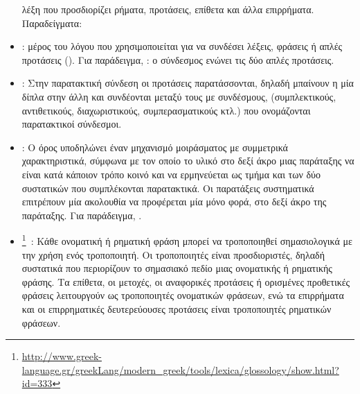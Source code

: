 \begin{itemize}
          λέξη που προσδιορίζει ρήματα, προτάσεις, επίθετα και άλλα επιρρήματα.
          Παραδείγματα:
    \item {}:
          μέρος του λόγου που χρησιμοποιείται για να συνδέσει λέξεις, φράσεις ή απλές προτάσεις ().
          Για παράδειγμα, : ο σύνδεσμος  ενώνει τις δύο απλές προτάσεις.
    \item {}:
          Στην παρατακτική σύνδεση οι προτάσεις παρατάσσονται, δηλαδή μπαίνουν η μία δίπλα στην άλλη και συνδέονται μεταξύ τους με συνδέσμους,
          (συμπλεκτικούς, αντιθετικούς, διαχωριστικούς, συμπερασματικούς κτλ.) που ονομάζονται παρατακτικοί σύνδεσμοι.
    \item {}:
          Ο όρος υποδηλώνει έναν μηχανισμό μοιράσματος με συμμετρικά χαρακτηριστικά,
          σύμφωνα με τον οποίο το υλικό στο δεξί άκρο μιας παράταξης να είναι κατά κάποιον τρόπο κοινό και να ερμηνεύεται ως τμήμα και των δύο συστατικών που συμπλέκονται παρατακτικά.
          Οι παρατάξεις συστηματικά επιτρέπουν μία ακολουθία να προφέρεται μία μόνο φορά, στο δεξί άκρο της παράταξης.
          Για παράδειγμα, .
    \item {}\footnote{\url{http://www.greek-language.gr/greekLang/modern_greek/tools/lexica/glossology/show.html?id=333}}~\cite{komvos}:
          Κάθε ονοματική ή ρηματική φράση μπορεί να τροποποιηθεί σημασιολογικά με την χρήση ενός τροποποιητή.
          Οι τροποποιητές είναι προσδιοριστές, δηλαδή συστατικά που περιορίζουν το σημασιακό πεδίο μιας ονοματικής ή ρηματικής φράσης.
          Τα επίθετα, οι μετοχές, οι αναφορικές προτάσεις ή ορισμένες προθετικές φράσεις λειτουργούν ως τροποποιητές ονοματικών φράσεων, ενώ τα επιρρήματα και οι επιρρηματικές δευτερεύουσες προτάσεις είναι τροποποιητές ρηματικών φράσεων.

\end{itemize}
